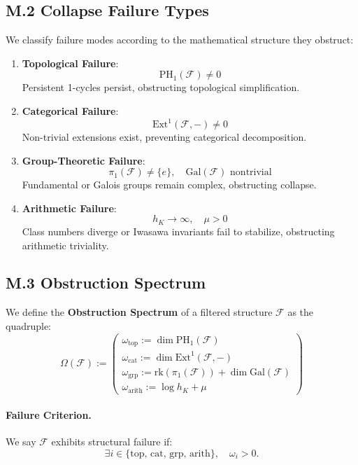 \documentclass[11pt]{article}
\begin{document}
\subsection*{M.2 Collapse Failure Types}

We classify failure modes according to the mathematical structure they obstruct:

\begin{enumerate}
    \item \textbf{Topological Failure}:
    \[
    \mathrm{PH}_1(\mathcal{F}) \neq 0
    \]
    Persistent 1-cycles persist, obstructing topological simplification.

    \item \textbf{Categorical Failure}:
    \[
    \mathrm{Ext}^1(\mathcal{F}, -) \neq 0
    \]
    Non-trivial extensions exist, preventing categorical decomposition.

    \item \textbf{Group-Theoretic Failure}:
    \[
    \pi_1(\mathcal{F}) \neq \{e\}, \quad \mathrm{Gal}(\mathcal{F}) \text{ nontrivial}
    \]
    Fundamental or Galois groups remain complex, obstructing collapse.

    \item \textbf{Arithmetic Failure}:
    \[
    h_K \to \infty, \quad \mu > 0
    \]
    Class numbers diverge or Iwasawa invariants fail to stabilize, obstructing arithmetic triviality.
\end{enumerate}

\subsection*{M.3 Obstruction Spectrum}

We define the \textbf{Obstruction Spectrum} of a filtered structure $\mathcal{F}$ as the quadruple:
\[
\Omega(\mathcal{F}) := \left(
\begin{array}{l}
\omega_{\mathrm{top}} := \dim \mathrm{PH}_1(\mathcal{F}) \\
\omega_{\mathrm{cat}} := \dim \mathrm{Ext}^1(\mathcal{F}, -) \\
\omega_{\mathrm{grp}} := \mathrm{rk}(\pi_1(\mathcal{F})) + \dim \mathrm{Gal}(\mathcal{F}) \\
\omega_{\mathrm{arith}} := \log h_K + \mu
\end{array}
\right)
\]

\paragraph{Failure Criterion.}
We say $\mathcal{F}$ exhibits structural failure if:
\[
\exists i \in \{\text{top, cat, grp, arith}\}, \quad \omega_i > 0.
\]
\end{document}
